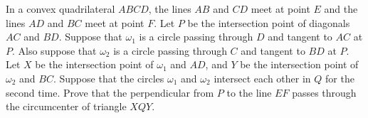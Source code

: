 In a convex quadrilateral $ABCD$,  the lines $AB$ and $CD$ meet at point $E$ and the lines $AD$ and $BC$ meet at point $F$. Let $P$ be the intersection point of diagonals $AC$ and $BD$. Suppose that $\omega_1$ is a circle passing through $D$ and tangent to $AC$ at $P$. Also suppose that $\omega_2$ is a circle passing through $C$ and tangent to $BD$ at $P$. Let $X$ be the intersection point of $\omega_1$ and $AD$,  and $Y$ be the intersection point of $\omega_2$ and $BC$. Suppose that the circles $\omega_1$ and $\omega_2$ intersect each other in $Q$ for the second time. Prove that the perpendicular from $P$ to the line $EF$ passes through the circumcenter of triangle $XQY$.